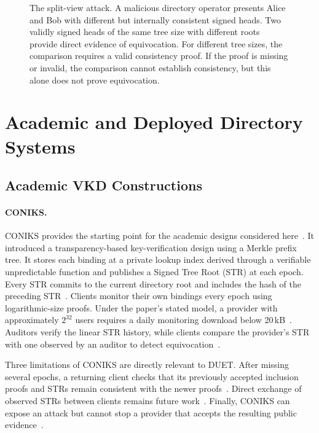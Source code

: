 \begin{figure}[H]
\centering

\caption[The split-view (fork) attack.]{The split-view attack. A malicious directory operator
presents Alice and Bob with different but internally consistent signed heads. Two validly signed
heads of the same tree size with different roots provide direct evidence of equivocation. For
different tree sizes, the comparison requires a valid consistency proof. If the proof is missing
or invalid, the comparison cannot establish consistency, but this alone does not prove equivocation.}
\label{fig:bg-splitview}
\end{figure}

\section{Academic and Deployed Directory Systems}\label{sec:ext-vkd-survey}

\subsection{Academic VKD Constructions}

\paragraph{CONIKS.}
CONIKS provides the starting point for the academic designs considered
here~\cite{melara2015coniks}. It introduced a
transparency-based key-verification design using a Merkle prefix tree. It stores each binding at a
private lookup index derived through a verifiable unpredictable function and publishes a Signed
Tree Root (STR) at each epoch. Every STR commits to the current directory root and includes the hash
of the preceding STR~\cite[Section~3]{melara2015coniks}. Clients monitor their own
bindings every epoch using logarithmic-size proofs. Under the paper's stated model, a provider with
approximately $2^{32}$ users requires a daily monitoring download below
20\,kB~\cite[Sections~4.1.3 and~5.3]{melara2015coniks}. Auditors verify the linear STR history, while
clients compare the provider's STR with one observed by an auditor to detect
equivocation~\cite[Section~4.1.4]{melara2015coniks}.

Three limitations of CONIKS are directly relevant to DUET. After missing several epochs, a returning
client checks that its previously accepted inclusion proofs and STRs remain consistent with the
newer proofs~\cite{melara2015coniks}. Direct exchange of observed
STRs between clients remains future work~\cite[Section~4.1.4, footnote~5]{melara2015coniks}.
Finally, CONIKS can expose an attack but cannot stop a provider that accepts the resulting public
evidence~\cite[Section~2.1]{melara2015coniks}.


